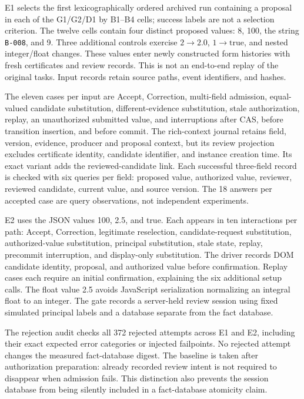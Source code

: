 \documentclass[11pt,a4paper]{article}
\newcommand{\code}[1]{\nolinkurl{#1}}
\begin{document}
E1 selects the first lexicographically ordered archived run containing a proposal in each of the G1/G2/D1 by B1--B4 cells; success labels are not a selection criterion. The twelve cells contain four distinct proposed values: 8, 100, the string \code{B-008}, and 9. Three additional controls exercise $2\rightarrow2.0$, $1\rightarrow\mathrm{true}$, and nested integer/float changes. These values enter newly constructed form histories with fresh certificates and review records. This is not an end-to-end replay of the original tasks. Input records retain source paths, event identifiers, and hashes.

The eleven cases per input are Accept, Correction, multi-field admission, equal-valued candidate substitution, different-evidence substitution, stale authorization, replay, an unauthorized submitted value, and interruptions after CAS, before transition insertion, and before commit. The rich-context journal retains field, version, evidence, producer and proposal context, but its review projection excludes certificate identity, candidate identifier, and instance creation time. Its exact variant adds the reviewed-candidate link. Each successful three-field record is checked with six queries per field: proposed value, authorized value, reviewer, reviewed candidate, current value, and source version. The 18 answers per accepted case are query observations, not independent experiments.

E2 uses the JSON values 100, 2.5, and true. Each appears in ten interactions per path: Accept, Correction, legitimate reselection, candidate-request substitution, authorized-value substitution, principal substitution, stale state, replay, precommit interruption, and display-only substitution. The driver records DOM candidate identity, proposal, and authorized value before confirmation. Replay cases each require an initial confirmation, explaining the six additional setup calls. The float value 2.5 avoids JavaScript serialization normalizing an integral float to an integer. The gate records a server-held review session using fixed simulated principal labels and a database separate from the fact database.

The rejection audit checks all 372 rejected attempts across E1 and E2, including their exact expected error categories or injected failpoints. No rejected attempt changes the measured fact-database digest. The baseline is taken after authorization preparation: already recorded review intent is not required to disappear when admission fails. This distinction also prevents the session database from being silently included in a fact-database atomicity claim.
\end{document}
